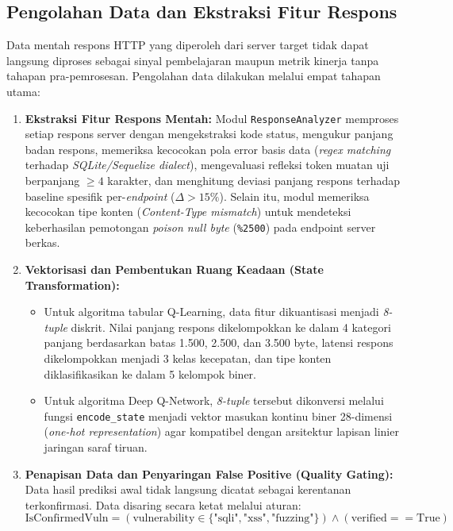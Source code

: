 \subsection{Pengolahan Data dan Ekstraksi Fitur Respons}

Data mentah respons HTTP yang diperoleh dari server target tidak dapat langsung diproses sebagai sinyal pembelajaran maupun metrik kinerja tanpa tahapan pra-pemrosesan. Pengolahan data dilakukan melalui empat tahapan utama:
\begin{enumerate}
    \item \textbf{Ekstraksi Fitur Respons Mentah:} Modul \texttt{ResponseAnalyzer} memproses setiap respons server dengan mengekstraksi kode status, mengukur panjang badan respons, memeriksa kecocokan pola error basis data (\textit{regex matching} terhadap \textit{SQLite/Sequelize dialect}), mengevaluasi refleksi token muatan uji berpanjang $\ge 4$ karakter, dan menghitung deviasi panjang respons terhadap baseline spesifik per-\textit{endpoint} ($\Delta > 15\%$). Selain itu, modul memeriksa kecocokan tipe konten (\textit{Content-Type mismatch}) untuk mendeteksi keberhasilan pemotongan \textit{poison null byte} (\texttt{\%2500}) pada endpoint server berkas.
    \item \textbf{Vektorisasi dan Pembentukan Ruang Keadaan (State Transformation):}
    \begin{itemize}
        \item Untuk algoritma tabular Q-Learning, data fitur dikuantisasi menjadi \textit{8-tuple} diskrit. Nilai panjang respons dikelompokkan ke dalam 4 kategori panjang berdasarkan batas 1.500, 2.500, dan 3.500 byte, latensi respons dikelompokkan menjadi 3 kelas kecepatan, dan tipe konten diklasifikasikan ke dalam 5 kelompok biner.
        \item Untuk algoritma Deep Q-Network, \textit{8-tuple} tersebut dikonversi melalui fungsi \texttt{encode\_state} menjadi vektor masukan kontinu biner 28-dimensi (\textit{one-hot representation}) agar kompatibel dengan arsitektur lapisan linier jaringan saraf tiruan.
    \end{itemize}
    \item \textbf{Penapisan Data dan Penyaringan False Positive (Quality Gating):}
    Data hasil prediksi awal tidak langsung dicatat sebagai kerentanan terkonfirmasi. Data disaring secara ketat melalui aturan:
    \begin{equation}
    \text{IsConfirmedVuln} = (\text{vulnerability} \in \{\text{"sqli"}, \text{"xss"}, \text{"fuzzing"}\}) \land (\text{verified} == \text{True})

\end{equation}
\end{enumerate}
